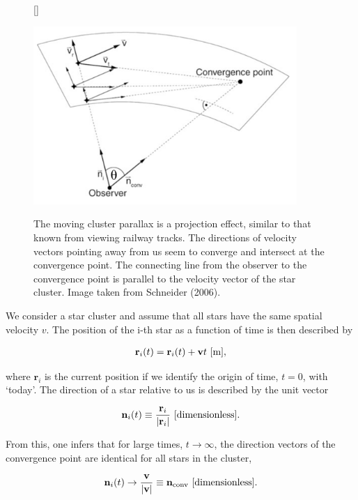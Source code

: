 \documentclass[a4paper,11pt]{article}
\begin{document}
\begin{figure}[h]
    [\FBwidth]
    {\caption{\footnotesize{The moving cluster parallax is a projection effect, similar to that known from viewing railway tracks. The directions of velocity vectors pointing away from us seem to converge and intersect at the convergence point. The connecting line from the observer to the convergence point is parallel to the velocity vector of the star cluster. Image taken from Schneider (2006).}}
    \label{fig:clusterparallax}}
    {\includegraphics[width=10cm]{figures/ClusterParallax.png}}
\end{figure}

{\noindent}We consider a star cluster and assume that all stars have the same spatial velocity $v$. The position of the i-th star as a function of time is then described by

\begin{align*}
    \mathbf{r}_i(t) = \mathbf{r}_i(t) + \mathbf{v}t ~ [{\rm m}],
\end{align*}

{\noindent}where $\mathbf{r}_i$ is the current position if we identify the origin of time, $t=0$, with `today'. The direction of a star relative to us is described by the unit vector

\begin{align*}
    \mathbf{n}_i(t) \equiv \frac{\mathbf{r}_i}{\lvert\mathbf{r}_i\rvert} ~ [{\rm dimensionless}].
\end{align*}

{\noindent}From this, one infers that for large times, $t\rightarrow\infty$, the direction vectors of the convergence point are identical for all stars in the cluster,

\begin{align*}
    \mathbf{n}_i(t) \rightarrow \frac{\mathbf{v}}{\lvert\mathbf{v}\rvert} \equiv \mathbf{n}_\mathrm{conv} ~ [{\rm dimensionless}].
\end{align*}
\end{document}
